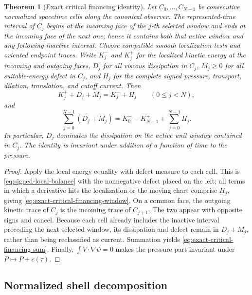 \documentclass[11pt]{amsart}
\numberwithin{equation}{section}
\theoremstyle{plain}
\newtheorem{theorem}{Theorem}[section]
\theoremstyle{definition}
\theoremstyle{remark}
\begin{document}
\begin{theorem}[Exact critical financing identity]
\label{thm:exact-critical-financing}
Let \(C_0,\ldots,C_{N-1}\) be consecutive normalized spacetime cells along
the canonical observer.  The represented-time interval of \(C_j\) begins at
the incoming face of the \(j\)-th selected window and ends at the incoming
face of the next one; hence it contains both that active window and any
following inactive interval.  Choose compatible smooth localization tests
and oriented endpoint traces.  Write \(K_j^-\) and \(K_j^+\) for the
localized kinetic energy at the incoming and outgoing faces, \(D_j\) for all
viscous dissipation in \(C_j\), \(M_j\ge0\) for all suitable-energy defect in
\(C_j\), and \(H_j\) for the complete signed pressure, transport, dilation,
translation, and cutoff current.  Then
\begin{equation}\label{eq:exact-critical-financing-window}
 K_j^+ +D_j+M_j=K_j^-+H_j
 \qquad(0\le j<N),
\end{equation}
and
\begin{equation}\label{eq:exact-critical-financing-sum}
 \sum_{j=0}^{N-1}(D_j+M_j)
 =K_0^- -K_{N-1}^+ +\sum_{j=0}^{N-1}H_j.
\end{equation}
In particular, \(D_j\) dominates the dissipation on the active unit window
contained in \(C_j\).  The identity is invariant under addition of a function
of time to the pressure.
\end{theorem}

\begin{proof}
Apply the local energy equality with defect measure to each cell.  This is
\eqref{eq:signed-local-balance} with the nonnegative defect placed on the
left; all terms in which a derivative hits the localization or the moving
chart comprise \(H_j\), giving
\eqref{eq:exact-critical-financing-window}.  On a common face, the outgoing
kinetic trace of \(C_j\) is the incoming trace of \(C_{j+1}\).  The two
appear with opposite signs and cancel.  Because each cell already includes
the inactive interval preceding the next selected window, its dissipation and
defect remain in \(D_j+M_j\), rather than being reclassified as current.
Summation yields
\eqref{eq:exact-critical-financing-sum}.  Finally,
\(\int V\cdot\nabla\psi=0\) makes the pressure part invariant under
\(P\mapsto P+c(\tau)\).
\end{proof}

\subsection{Normalized shell decomposition}
\end{document}
